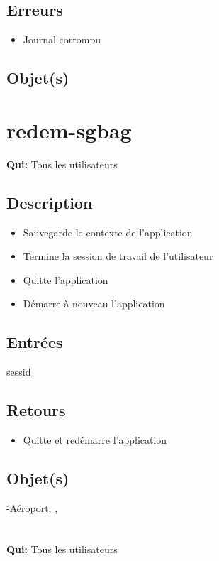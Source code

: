 	\subsection{Erreurs}
	\begin{itemize}
		\item Journal corrompu \fatal
	\end{itemize}

	\subsection{Objet(s)}
		\logs

\section{redem-sgbag}
	\textbf{Qui:} Tous les utilisateurs

	\subsection{Description}
	\begin{itemize}
		\item Sauvegarde le contexte de l'application
		\item Termine la session de travail de l'utilisateur
		\item Quitte l'application
		\item Démarre à nouveau l'application
	\end{itemize}

	\subsection{Entrées}
		sessid
		
	\subsection{Retours}
	\begin{itemize}
		\item Quitte et redémarre l'application
	\end{itemize}

	\subsection{Objet(s)}
		\u-Aéroport, \logs, \event

\section{}
	\textbf{Qui:} Tous les utilisateurs

